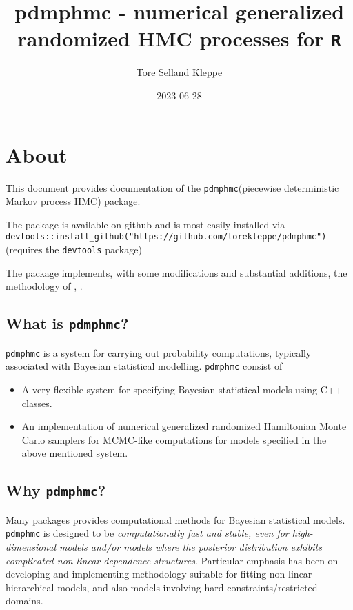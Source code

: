 \documentclass[
]{book}
\title{pdmphmc - numerical generalized randomized HMC processes for \texttt{R}}
\author{Tore Selland Kleppe}
\date{2023-06-28}
\begin{document}
\maketitle

{
\setcounter{tocdepth}{1}
\tableofcontents
}
\hypertarget{about}{%
\chapter{About}\label{about}}

This document provides documentation of the \texttt{pdmphmc}(piecewise deterministic Markov process HMC) package.

The package is available on github and is most easily installed via \texttt{devtools::install\_github("https://github.com/torekleppe/pdmphmc")} (requires the \texttt{devtools} package)

The package implements, with some modifications and substantial additions, the methodology of \citet{kleppe_CTHMC}, \citet{kleppe_amt}.

\hypertarget{what-is-pdmphmc}{%
\section{\texorpdfstring{What is \texttt{pdmphmc}?}{What is pdmphmc?}}\label{what-is-pdmphmc}}

\texttt{pdmphmc} is a system for carrying out probability computations, typically associated with Bayesian statistical modelling. \texttt{pdmphmc} consist of

\begin{itemize}
\item
  A very flexible system for specifying Bayesian statistical models using C++ classes.
\item
  An implementation of numerical generalized randomized Hamiltonian Monte Carlo samplers for MCMC-like computations for models specified in the above mentioned system.
\end{itemize}

\hypertarget{why-pdmphmc}{%
\section{\texorpdfstring{Why \texttt{pdmphmc}?}{Why pdmphmc?}}\label{why-pdmphmc}}

Many packages provides computational methods for Bayesian statistical models. \texttt{pdmphmc} is designed to be \emph{computationally fast and stable, even for high-dimensional models and/or models where the posterior distribution exhibits complicated non-linear dependence structures}. Particular emphasis has been on developing and implementing methodology suitable for fitting non-linear hierarchical models, and also models involving hard constraints/restricted domains.
\end{document}

